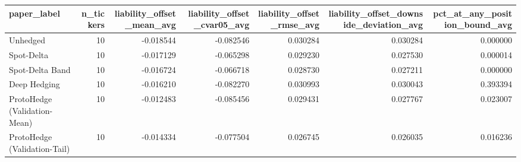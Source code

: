 \begin{tabular}{lrrrrrr}
\toprule
paper\_label & n\_tickers & liability\_offset\_mean\_avg & liability\_offset\_cvar05\_avg & liability\_offset\_rmse\_avg & liability\_offset\_downside\_deviation\_avg & pct\_at\_any\_position\_bound\_avg \\
\midrule
Unhedged & 10 & -0.018544 & -0.082546 & 0.030284 & 0.030284 & 0.000000 \\
Spot-Delta & 10 & -0.017129 & -0.065298 & 0.029230 & 0.027530 & 0.000014 \\
Spot-Delta Band & 10 & -0.016724 & -0.066718 & 0.028730 & 0.027211 & 0.000000 \\
Deep Hedging & 10 & -0.016210 & -0.082270 & 0.030993 & 0.030043 & 0.393394 \\
ProtoHedge (Validation-Mean) & 10 & -0.012483 & -0.085456 & 0.029431 & 0.027767 & 0.023007 \\
ProtoHedge (Validation-Tail) & 10 & -0.014334 & -0.077504 & 0.026745 & 0.026035 & 0.016236 \\
\bottomrule
\end{tabular}
